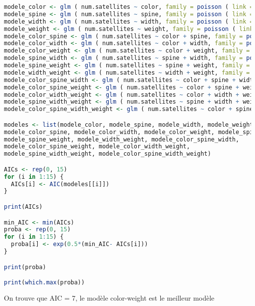 \documentclass{article}
\begin{document}
\begin {lstlisting}[language=R]
modele_color <- glm ( num.satellites ~ color, family = poisson ( link = log ) ,data = hcrabs ) 
modele_spine <- glm ( num.satellites ~ spine, family = poisson ( link = log ) ,data = hcrabs )
modele_width <- glm ( num.satellites ~ width, family = poisson ( link = log ) ,data = hcrabs )
modele_weight <- glm ( num.satellites ~ weight, family = poisson ( link = log ) ,data = hcrabs )
modele_color_spine <- glm ( num.satellites ~ color + spine, family = poisson ( link = log ) ,data = hcrabs )
modele_color_width <- glm ( num.satellites ~ color + width, family = poisson ( link = log ) ,data = hcrabs )
modele_color_weight <- glm ( num.satellites ~ color + weight, family = poisson ( link = log ) ,data = hcrabs )
modele_spine_width <- glm ( num.satellites ~ spine + width, family = poisson ( link = log ) ,data = hcrabs )
modele_spine_weight <- glm ( num.satellites ~ spine + weight, family = poisson ( link = log ) ,data = hcrabs )
modele_width_weight <- glm ( num.satellites ~ width + weight, family = poisson ( link = log ) ,data = hcrabs )
modele_color_spine_width <- glm ( num.satellites ~ color + spine + width, family = poisson ( link = log ) ,data = hcrabs )
modele_color_spine_weight <- glm ( num.satellites ~ color + spine + weight, family = poisson ( link = log ) ,data = hcrabs )
modele_color_width_weight <- glm ( num.satellites ~ color + width + weight, family = poisson ( link = log ) ,data = hcrabs )
modele_spine_width_weight <- glm ( num.satellites ~ spine + width + weight, family = poisson ( link = log ) ,data = hcrabs )
modele_color_spine_width_weight <- glm ( num.satellites ~ color + spine + width + weight, family = poisson ( link = log ) ,data = hcrabs )

modeles <- list(modele_color, modele_spine, modele_width, modele_weight, 
modele_color_spine, modele_color_width, modele_color_weight, modele_spine_width, 
modele_spine_weight, modele_width_weight, modele_color_spine_width, 
modele_color_spine_weight, modele_color_width_weight, 
modele_spine_width_weight, modele_color_spine_width_weight)

AICs <- rep(0, 15)
for (i in 1:15) {
  AICs[i] <- AIC(modeles[[i]])
}

print(AICs)

min_AIC <- min(AICs)
proba <- rep(0, 15)
for (i in 1:15) {
  proba[i] <- exp(0.5*(min_AIC- AICs[i]))
}

print(proba)

print(which.max(proba))

\end{lstlisting}
 On trouve que AIC = 7, le modèle color-weight est le meilleur modèle
\end{document}
